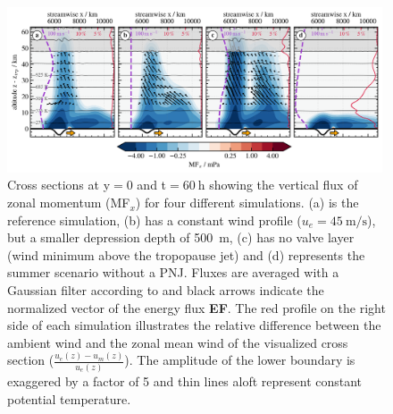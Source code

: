 \begin{figure}[t]
    \centering
    \includegraphics[width=0.99\textwidth]{figures_q3D/Q3D-MFx-towers.png}
    \caption{Cross sections at y$=0$ and t$=\SI{60}{\hour}$ showing the vertical flux of zonal momentum (MF$_x$) for four different simulations. (a) is the reference simulation, (b) has a constant wind profile ($u_e=\SI{45}{\meter\per\second}$), but a smaller depression depth of \SI{500}{\meter}, (c) has no valve layer (wind minimum above the tropopause jet) and (d) represents the summer scenario without a PNJ. Fluxes are averaged with a Gaussian filter according to \textcite[]{kruse_gravity_2015} and black arrows indicate the normalized vector of the energy flux \textbf{EF}. The red profile on the right side of each simulation illustrates the relative difference between the ambient wind and the zonal mean wind of the visualized cross section ($\frac{u_e(z)-u_m(z)}{u_e(z)}$). The amplitude of the lower boundary is exaggered by a factor of 5 and thin lines aloft represent constant potential temperature.}
    \label{fig:q3D-mfx-towers}
\end{figure}
%
